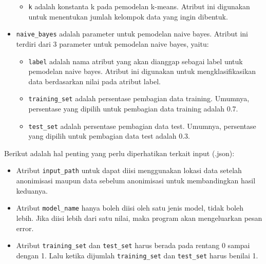 \begin{itemize}
\begin{itemize}

\item \texttt{k} adalah konstanta k pada pemodelan k-means. Atribut ini digunakan untuk menentukan jumlah kelompok data yang ingin dibentuk.

\end{itemize}

\item \texttt{naive\_bayes} adalah parameter untuk pemodelan naive bayes. Atribut ini terdiri dari 3 parameter untuk pemodelan naive bayes, yaitu:

\begin{itemize}

\item \texttt{label} adalah nama atribut yang akan dianggap sebagai label untuk pemodelan naive bayes. Atribut ini digunakan untuk mengklasifikasikan data berdasarkan nilai pada atribut label.

\item \texttt{training\_set} adalah persentase pembagian data training. Umumnya, persentase yang dipilih untuk pembagian data training adalah 0.7.

\item \texttt{test\_set} adalah persentase pembagian data test. Umumnya, persentase yang dipilih untuk pembagian data test adalah 0.3.

\end{itemize}


\end{itemize}

\noindent Berikut adalah hal penting yang perlu diperhatikan terkait input (.json):

\begin{itemize}

\item Atribut \texttt{input\_path} untuk dapat diisi menggunakan lokasi data setelah anonimisasi maupun data sebelum anonimisasi untuk membandingkan hasil keduanya.
\item Atribut \texttt{model\_name} hanya boleh diisi oleh satu jenis model, tidak boleh lebih. Jika diisi lebih dari satu nilai, maka program akan mengeluarkan pesan error.
\item Atribut \texttt{training\_set} dan \texttt{test\_set} harus berada pada rentang 0 sampai dengan 1. Lalu ketika dijumlah \texttt{training\_set} dan \texttt{test\_set} harus benilai 1.

\end{itemize}


